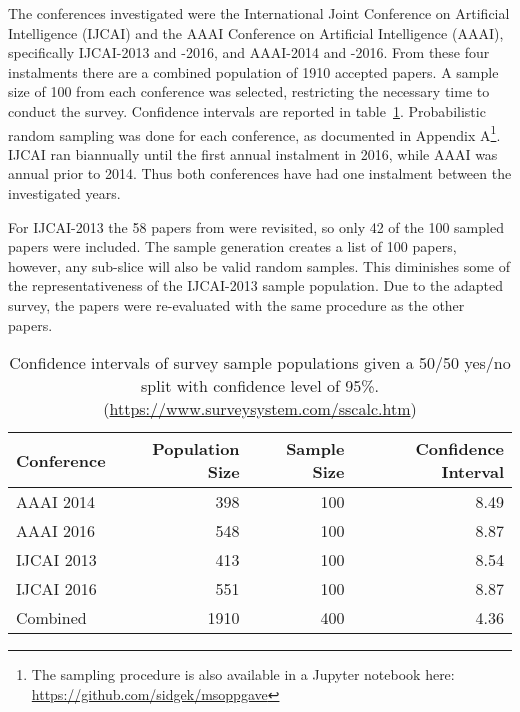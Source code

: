 The conferences investigated were the International Joint Conference on Artificial Intelligence (IJCAI) and the AAAI Conference on Artificial Intelligence (AAAI), specifically IJCAI-2013 and -2016, and AAAI-2014 and -2016. From these four instalments there are a combined population of 1910 accepted papers. A sample size of 100 from each conference was selected, restricting the necessary time to conduct the survey. Confidence intervals are reported in table~\ref{tab:survey-confidence}. Probabilistic random sampling was done for each conference, as documented in Appendix A\footnote{The sampling procedure is also available in a Jupyter notebook here: \url{https://github.com/sidgek/msoppgave}}. IJCAI ran biannually until the first annual instalment in 2016, while AAAI was annual prior to 2014. Thus both conferences have had one instalment between the investigated years.

For IJCAI-2013 the 58 papers from \cite{Gundersen2015} were revisited, so only 42 of the 100 sampled papers were included. The sample generation creates a list of 100 papers, however, any sub-slice will also be valid random samples. This diminishes some of the representativeness of the IJCAI-2013 sample population. Due to the adapted survey, the papers were re-evaluated with the same procedure as the other papers.

\begin{table}[!h]
\begin{center}
    \begin{tabular}{  l | r  r  r }
    \textbf{Conference} & \textbf{Population Size} & \textbf{Sample Size} & \textbf{Confidence Interval} \\ \hline
    AAAI 2014 & 398 & 100 & 8.49 \\
    AAAI 2016 & 548 & 100 & 8.87 \\
    IJCAI 2013 & 413 & 100 & 8.54 \\
    IJCAI 2016 & 551 & 100 & 8.87 \\ \hline
    Combined & 1910 & 400 & 4.36 \\
    \end{tabular}
\end{center}
\caption[Confidence intervals of survey sample populations.]{Confidence intervals of survey sample populations given a 50/50  yes/no split with confidence level of 95\%. (\url{https://www.surveysystem.com/sscalc.htm})}
\label{tab:survey-confidence}
\end{table}

